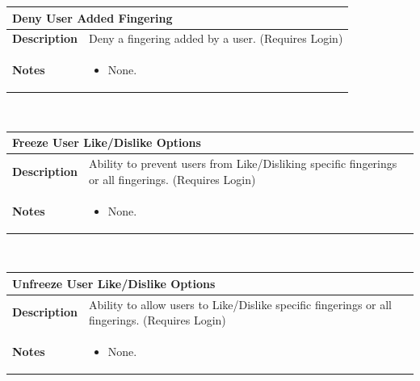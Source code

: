 \documentclass[12pt,english]{article}
\providecommand{\tabularnewline}{\\}
\begin{document}
\begin{tabular}{|p{3cm}|p{13cm}|}
	\hline 
	\multicolumn{2}{|l|}{\textbf{Deny User Added Fingering}}\tabularnewline
	\hline 
	\textbf{Description}  & Deny a fingering added by a user. (Requires Login) \tabularnewline
	\hline 
	\textbf{Notes}  & 
		\begin{itemize}
			\item None. 
		\end{itemize}
	\tabularnewline
	\hline 
\end{tabular}\\[0.5cm] %
\begin{tabular}{|p{3cm}|p{13cm}|}
	\hline 
	\multicolumn{2}{|l|}{\textbf{Freeze User Like/Dislike Options}}\tabularnewline
	\hline 
	\textbf{Description}  & Ability to prevent users from Like/Disliking specific fingerings or all 
		fingerings. (Requires Login) \tabularnewline
	\hline 
	\textbf{Notes}  & 
		\begin{itemize}
			\item None. 
		\end{itemize}
	\tabularnewline
	\hline 
\end{tabular}\\[0.5cm] %
\begin{tabular}{|p{3cm}|p{13cm}|}
	\hline 
	\multicolumn{2}{|l|}{\textbf{Unfreeze User Like/Dislike Options}}\tabularnewline
	\hline 
	\textbf{Description}  & Ability to allow users to Like/Dislike specific fingerings or all
		fingerings. (Requires Login) \tabularnewline
	\hline 
	\textbf{Notes}  & 
		\begin{itemize}
			\item None. 
		\end{itemize}
	\tabularnewline
	\hline 
\end{tabular}\\[0.5cm] 
\end{document}
